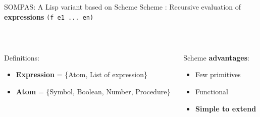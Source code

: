 \begin{frame}[fragile]{SOMPAS: A Lisp variant based on Scheme}
    \centering
    Scheme : Recursive evaluation of \textbf{expressions} \verb|(f e1 ... en)|
    
    ~~

\pause
    \begin{columns}[t]
        \begin{column}{0.65\textwidth}
            Definitions:
            \begin{itemize}
                \item \textbf{Expression} = \{Atom, List of expression\}
                \item \textbf{Atom} = \{Symbol, Boolean, Number, Procedure\}
            \end{itemize}
\pause
        \end{column}
        \begin{column}{0.35\textwidth}
            Scheme \textbf{advantages}:
            \begin{itemize}
                \item Few primitives
                \item Functional
                \item \textbf{Simple to extend}
            \end{itemize}
        \end{column}
     \end{columns}
\end{frame}

